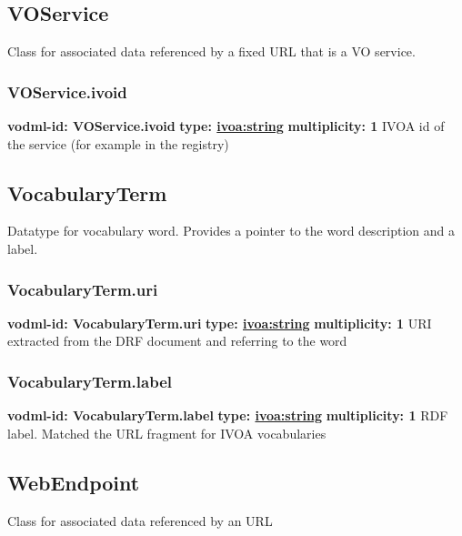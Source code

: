   \subsection{VOService}
  \label{sect:VOService}
    Class for associated data referenced by a fixed URL that is a VO service.

    \subsubsection{VOService.ivoid}
      \textbf{vodml-id: VOService.ivoid} \newline
      \textbf{type: \hyperref[sect:ivoa]{ivoa:string}} \newline
      \textbf{multiplicity: 1} \newline 
      IVOA id of the service (for example in the registry)

  \subsection{VocabularyTerm}
  \label{sect:VocabularyTerm}
    Datatype for vocabulary word. Provides a pointer to the word description and a label.

    \subsubsection{VocabularyTerm.uri}
      \textbf{vodml-id: VocabularyTerm.uri} \newline
      \textbf{type: \hyperref[sect:ivoa]{ivoa:string}} \newline
      \textbf{multiplicity: 1} \newline 
      URI extracted from the DRF document and referring to the word

    \subsubsection{VocabularyTerm.label}
      \textbf{vodml-id: VocabularyTerm.label} \newline
      \textbf{type: \hyperref[sect:ivoa]{ivoa:string}} \newline
      \textbf{multiplicity: 1} \newline 
      RDF label. Matched the URL fragment for IVOA vocabularies

  \subsection{WebEndpoint}
  \label{sect:WebEndpoint}
    Class for associated data referenced by an URL

